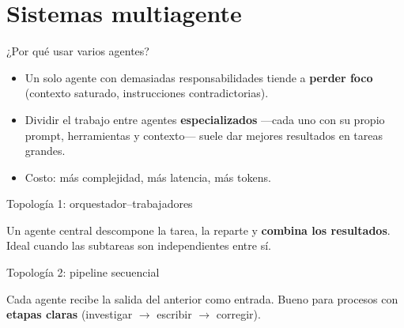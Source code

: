 \section{Sistemas multiagente}

\begin{frame}{¿Por qué usar varios agentes?}
  \begin{itemize}
    \item Un solo agente con demasiadas responsabilidades tiende a
      \textbf{perder foco} (contexto saturado, instrucciones contradictorias).
    \item Dividir el trabajo entre agentes \textbf{especializados}
      —cada uno con su propio prompt, herramientas y contexto— suele dar
      mejores resultados en tareas grandes.
    \item Costo: más complejidad, más latencia, más tokens.
  \end{itemize}
\end{frame}

\begin{frame}{Topología 1: orquestador–trabajadores}
  \centering
  \vfill
  \footnotesize Un agente central descompone la tarea, la reparte y
  \textbf{combina los resultados}. Ideal cuando las subtareas son
  independientes entre sí.
\end{frame}

\begin{frame}{Topología 2: pipeline secuencial}
  \centering
  \vfill
  \footnotesize Cada agente recibe la salida del anterior como entrada.
  Bueno para procesos con \textbf{etapas claras} (investigar $\to$ escribir
  $\to$ corregir).
\end{frame}

